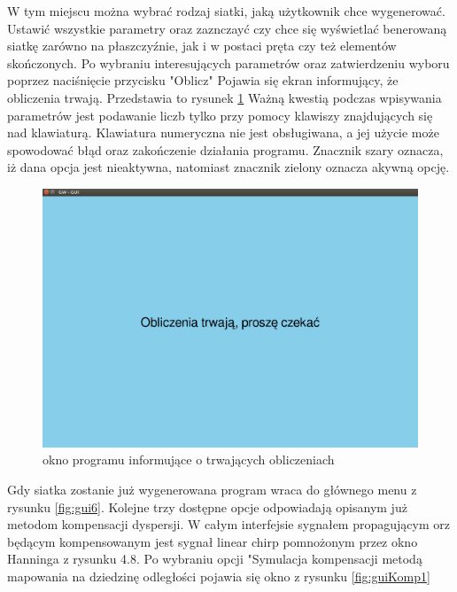 W tym miejscu można wybrać rodzaj siatki, jaką użytkownik chce wygenerować. Ustawić wszystkie parametry oraz zaznczayć czy chce się wyświetlać benerowaną siatkę zarówno na płaszczyźnie, jak i w postaci pręta czy też elementów skończonych. Po wybraniu interesujących parametrów oraz zatwierdzeniu wyboru poprzez naciśnięcie przycisku "Oblicz" Pojawia się ekran informujący, że obliczenia trwają. Przedstawia to rysunek \ref{fig:gui8}
Ważną kwestią podczas wpisywania parametrów jest podawanie liczb tylko przy pomocy klawiszy znajdujących się nad klawiaturą. Klawiatura numeryczna nie jest obsługiwana, a jej użycie może spowodować błąd oraz zakończenie działania programu. Znacznik szary oznacza, iż dana opcja jest nieaktywna, natomiast znacznik zielony oznacza akywną opcję.

\begin{figure}[h]
\centering
\includegraphics[width=13cm]{Zdjecia/5/kasia/gui8}
\caption{okno programu informujące o trwających obliczeniach}
\label{fig:gui8}
\end{figure}

Gdy siatka zostanie już wygenerowana program wraca do głównego menu z rysunku \ref{fig:gui6}. Kolejne trzy dostępne opcje odpowiadają opisanym już metodom kompensacji dyspersji. W całym interfejsie sygnałem propagującym orz będącym kompensowanym jest sygnał linear chirp pomnożonym przez okno Hanninga z rysunku 4.8. Po wybraniu opcji "Symulacja kompensacji metodą mapowania na dziedzinę odległości pojawia się okno z rysunku \ref{fig:guiKomp1}

